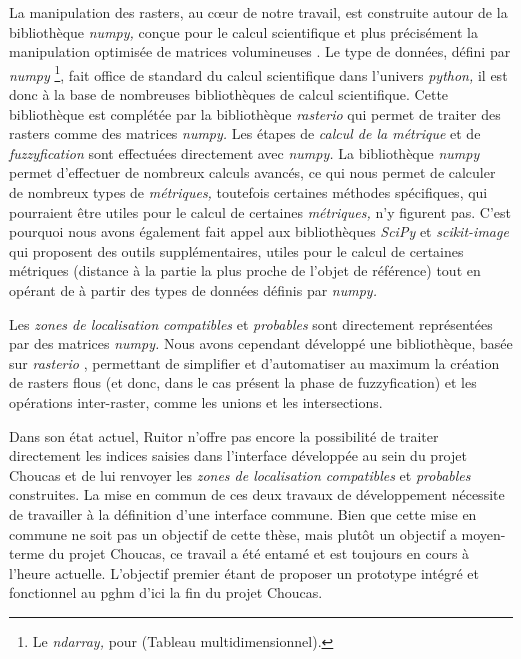 La manipulation des rasters, au cœur de notre travail, est construite
autour de la bibliothèque \emph{numpy,} conçue pour le calcul
scientifique et plus précisément la manipulation optimisée de matrices
volumineuses \autocite{vanderWalt2011}. Le type de données, défini par
\emph{numpy} \footnote{Le \emph{ndarray,} pour
   (Tableau
  multidimensionnel).}, fait office de standard du calcul scientifique
dans l'univers \emph{python,} il est donc à la base de nombreuses
bibliothèques de calcul scientifique. Cette bibliothèque est complétée
par la bibliothèque \emph{rasterio} \autocite{Mapbox2020} qui permet
de traiter des rasters comme des matrices \emph{numpy.} Les étapes de
\emph{calcul de la métrique} et de \emph{fuzzyfication} sont
effectuées directement avec \emph{numpy.} La bibliothèque \emph{numpy}
permet d'effectuer de nombreux calculs avancés, ce qui nous permet de
calculer de nombreux types de \emph{métriques,} toutefois certaines
méthodes spécifiques, qui pourraient être utiles pour le calcul de
certaines \emph{métriques,} n'y figurent pas. C'est pourquoi nous
avons également fait appel aux bibliothèques \emph{SciPy} et
\emph{scikit-image} \autocite{vanderWalt2014,Virtanen2020} qui
proposent des outils supplémentaires, utiles pour le calcul de
certaines métriques (\eg distance à la partie la plus proche de
l'objet de référence) tout en opérant de à partir des types de données
définis par \emph{numpy.}

Les \emph{zones de localisation} \emph{compatibles} et
\emph{probables} sont directement représentées par des matrices
\emph{numpy.} Nous avons cependant développé une bibliothèque, basée
sur \emph{rasterio} \autocite{Mapbox2020}, permettant de simplifier et
d'automatiser au maximum la création de rasters flous (et donc, dans
le cas présent la phase de fuzzyfication) et les opérations
inter-raster, comme les unions et les intersections.

Dans son état actuel, Ruitor n'offre pas encore la possibilité de
traiter directement les indices saisies dans l'interface développée au
sein du projet Choucas \autocite{Viry2019a} et de lui renvoyer les
\emph{zones de localisation compatibles} et \emph{probables}
construites. La mise en commun de ces deux travaux de développement
nécessite de travailler à la définition d'une interface commune. Bien
que cette mise en commune ne soit pas un objectif de cette thèse, mais
plutôt un objectif a moyen-terme du projet Choucas, ce travail a été
entamé et est toujours en cours à l'heure actuelle. L'objectif premier
étant de proposer un prototype intégré et fonctionnel au \ac{pghm}
d'ici la fin du projet Choucas.

